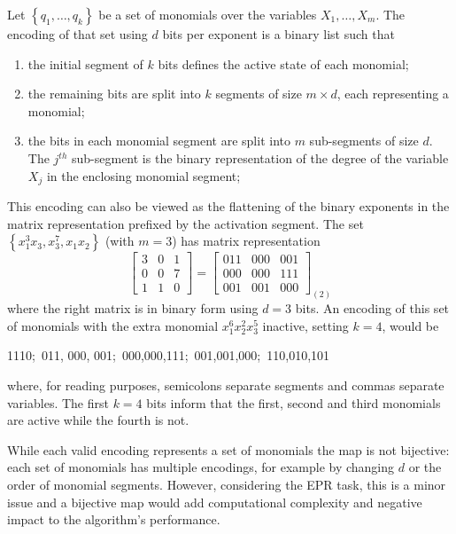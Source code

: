 \documentclass[preprint,authoryear,12pt]{elsarticle}
\newcommand{\nth}{\ensuremath{^{th}}}
\begin{document}
Let  $\left\lbrace q_1, \ldots, q_k\right\rbrace$ be a set of monomials over the variables $X_1, \ldots, X_m$. The encoding of that set using $d$ bits per exponent is a binary list such that
\begin{enumerate}
\item the initial segment of $k$ bits defines the active state of each monomial;
\item the remaining bits are split into $k$ segments of size $m\times d$, each representing a monomial;
\item the bits in each monomial segment are split into $m$ sub-segments of size $d$. The $j\nth$ sub-segment is the binary representation of the degree of the variable $X_j$ in the enclosing monomial segment;
\end{enumerate}
This encoding can also be viewed as the flattening of the binary exponents in the matrix representation prefixed by the activation segment. The set $\left\lbrace x_1^3 x_3, x_3^7, x_1 x_2\right\rbrace$ (with $m = 3$) has matrix representation
$$\left[ 
\begin{array}{ccc}
3 & 0 & 1 \\
0 & 0 & 7 \\
1 & 1 & 0
\end{array}
\right] = \left[ 
\begin{array}{ccc}
011 & 000 & 001 \\
000 & 000 & 111 \\
001 & 001 & 000
\end{array}
\right]_{\left( 2 \right)}
$$
where the right matrix is in binary form using $d = 3$ bits. An encoding of this set of monomials with the extra monomial $x_1^6x_2^2x_3^5$ inactive, setting $k = 4$, would be
\begin{center}
1110;~011, 000, 001;~000,000,111;~001,001,000;~110,010,101
\end{center}
where, for reading purposes, semicolons separate segments and commas separate variables. The first $k=4$ bits inform that the first, second and third monomials are active while the fourth is not.

While each valid encoding represents a set of monomials the map is not bijective: each set of monomials has multiple encodings, for example by changing $d$ or the order of monomial segments. However, considering the \ac{EPR} task, this is a minor issue and a bijective map would add computational complexity and negative impact to the algorithm's performance.
\end{document}
